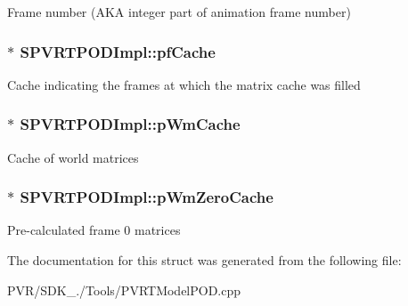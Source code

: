 Frame number (A\+K\+A integer part of animation frame number) \hypertarget{struct_s_p_v_r_t_p_o_d_impl_a3c69f6f366782ca066e8ba02947773f2}{
\subsubsection[{pf\+Cache}]{$\ast$ S\+P\+V\+R\+T\+P\+O\+D\+Impl\+::pf\+Cache}}\label{struct_s_p_v_r_t_p_o_d_impl_a3c69f6f366782ca066e8ba02947773f2}
Cache indicating the frames at which the matrix cache was filled \hypertarget{struct_s_p_v_r_t_p_o_d_impl_a0b83155ef715552a9be8edf633e080e4}{
\subsubsection[{p\+Wm\+Cache}]{$\ast$ S\+P\+V\+R\+T\+P\+O\+D\+Impl\+::p\+Wm\+Cache}}\label{struct_s_p_v_r_t_p_o_d_impl_a0b83155ef715552a9be8edf633e080e4}
Cache of world matrices \hypertarget{struct_s_p_v_r_t_p_o_d_impl_ac80e0c3a4d472863088172e90746f0f5}{
\subsubsection[{p\+Wm\+Zero\+Cache}]{$\ast$ S\+P\+V\+R\+T\+P\+O\+D\+Impl\+::p\+Wm\+Zero\+Cache}}\label{struct_s_p_v_r_t_p_o_d_impl_ac80e0c3a4d472863088172e90746f0f5}
Pre-\/calculated frame 0 matrices 

The documentation for this struct was generated from the following file\+:\begin{DoxyCompactItemize}
\item 
P\+V\+R/\+S\+D\+K\+\_./\+Tools/P\+V\+R\+T\+Model\+P\+O\+D.\+cpp\end{DoxyCompactItemize}
